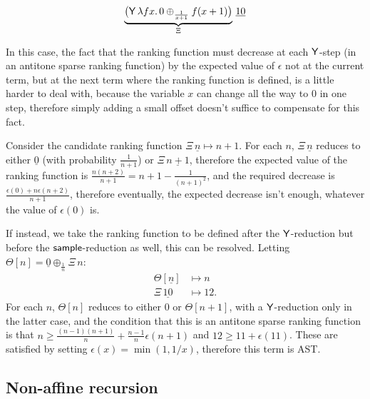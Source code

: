 \begin{example}
\label{ex:escaping spline}\cite[\S 5.4]{DBLP:journals/pacmpl/McIverMKK18}
\[
\underbrace{\big
(\mathsf{Y} \, \lambda f x . \,
0 \oplus_{\frac{1}{x+1}} f(x + 1) \big)}_{\Xi} 
\, \underline{10}
\]

In this case, the fact that the ranking function must decrease at each $\mathsf{Y}$-step (in an antitone sparse ranking function) by the expected value of $\epsilon$ not at the current term, but at the next term where the ranking function is defined, is a little harder to deal with, because the variable $x$ can change all the way to $0$ in one step, therefore simply adding a small offset doesn't suffice to compensate for this fact.

Consider the candidate ranking function $\Xi \, \underline n \mapsto n + 1$. For each $n$, $\Xi \, \underline n$ reduces to either $\underline 0$ (with probability $\frac 1 {n + 1}$) or $\Xi \, \underline{n + 1}$, therefore the expected value of the ranking function is $\frac{n(n+2)}{n+1} = n + 1 - \frac 1 {(n+1)^2}$, and the required decrease is $\frac{\epsilon(0) + n \epsilon(n + 2)}{n + 1}$, therefore eventually, the expected decrease isn't enough, whatever the value of $\epsilon(0)$ is.

If instead, we take the ranking function to be defined after the $\mathsf{Y}$-reduction but before the $\mathsf{sample}$-reduction as well, this can be resolved. Letting $\Theta[n] = \underline 0 \oplus_{\frac 1 n} \Xi \, n$:
\begin{align*}
\Theta[\underline n] &\mapsto n \\
\Xi \, \underline{10} & \mapsto 12.
\end{align*}
For each $n$, $\Theta[n]$ reduces to either $0$ or $\Theta[n+1]$, with a $\mathsf{Y}$-reduction only in the latter case, and the condition that this is an antitone sparse ranking function is that $n \geq \frac{(n-1)(n+1)}{n} + \frac{n-1}{n} \epsilon(n+1)$ and $12 \geq 11 + \epsilon(11)$. These are satisfied by setting $\epsilon(x) = \min(1, 1/x)$, therefore this term is AST.
\end{example}


\subsection*{Non-affine recursion}

